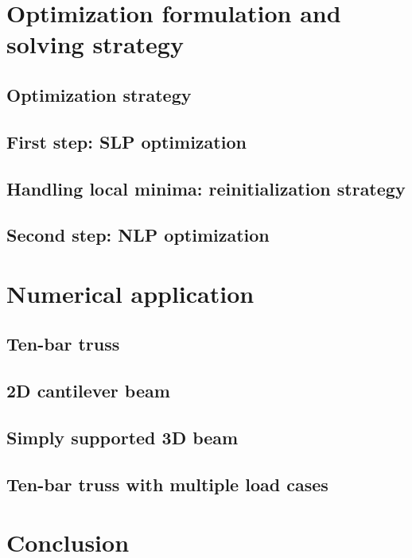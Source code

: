 \section{Optimization formulation and solving strategy}

\subsection{Optimization strategy}

\subsection{First step: SLP optimization}

\subsection{Handling local minima: reinitialization strategy}

\subsection{Second step: NLP optimization}

\section{Numerical application}

\subsection{Ten-bar truss}

\subsection{2D cantilever beam}

\subsection{Simply supported 3D beam}

\subsection{Ten-bar truss with multiple load cases}

\section{Conclusion}
